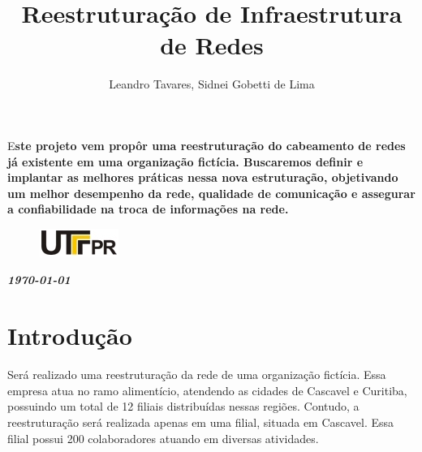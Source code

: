 \documentclass[	DIV=calc,%
							paper=a4,%
							fontsize=12pt,%
							onecolumn]{scrartcl}	 					%
\title{Reestruturação de Infraestrutura de Redes}					%
\author{Leandro Tavares, Sidnei Gobetti de Lima }  	%
\date{}																				%
\newcommand{\initial}[1]{%
     \lettrine[lines=3,lhang=0.3,nindent=0em]{
     				\color{DarkGoldenrod}
     				{\textsf{#1}}}{}}
\begin{document}
\maketitle
\thispagestyle{fancy} 	
\thispagestyle{empty}		%




\initial{E}\textbf{ste projeto vem propôr uma reestruturação do cabeamento de redes já existente em uma organização fictícia. Buscaremos definir e implantar as melhores práticas nessa nova estruturação, objetivando um melhor desempenho da rede, qualidade de comunicação e assegurar a confiabilidade na troca de informações na rede.}

\begin{figure}
	\centering
	\includegraphics{utfpr}
\end{figure}

\vspace{3cm}
\centerline{\textit{\textbf{\today}}}

\clearpage
    \renewcommand*\listfigurename{Lista de figuras}
\listoffigures

\renewcommand*\listtablename{Lista de tabelas}
\listoftables




\clearpage
\renewcommand{\contentsname}{Sumário}
\tableofcontents
\clearpage

\section{Introdução}
Será realizado uma reestruturação da rede de uma organização fictícia. Essa empresa atua no ramo alimentício, atendendo as cidades de Cascavel e Curitiba, possuindo um total de 12 filiais distribuídas nessas regiões. Contudo, a reestruturação será realizada apenas em uma filial, situada em Cascavel. Essa filial possui 200 colaboradores atuando em diversas atividades.
\end{document}
